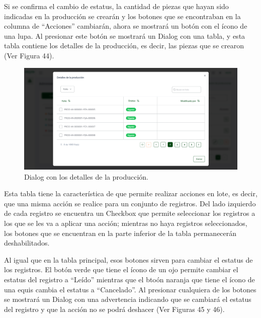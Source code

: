 Si se confirma el cambio de estatus, la cantidad de piezas que hayan sido indicadas en la producción se crearán y los botones que se encontraban en la columna de ``Acciones'' cambiarán, ahora se mostrará un botón con el ícono de una lupa. Al presionar este botón se mostrará un Dialog con una tabla, y esta tabla contiene los detalles de la producción, es decir, las piezas que se crearon (Ver Figura 44).

    \begin{figure}[H]
        \begin{center}
            \includegraphics[scale=0.33]{img/actividades/producciones/prod-detalles.png}
            \caption{Dialog con los detalles de la producción.}
            \label{fig:prod-detalles}
        \end{center}
    \end{figure}

Esta tabla tiene la característica de que permite realizar acciones en lote, es decir, que una misma acción se realice para un conjunto de registros. Del lado izquierdo de cada registro se encuentra un Checkbox que permite seleccionar los registros a los que se les va a aplicar una acción; mientras no haya registros seleccionados, los botones que se encuentran en la parte inferior de la tabla permanecerán deshabilitados.

Al igual que en la tabla principal, esos botones sirven para cambiar el estatus de los registros. El botón verde que tiene el ícono de un ojo permite cambiar el estatus del registro a ``Leído'' mientras que el btoón naranja que tiene el ícono de una equis cambia el estatus a ``Cancelado''. Al presionar cualquiera de los botones se mostrará un Dialog con una advertencia indicando que se cambiará el estatus del registro y que la acción no se podrá deshacer (Ver Figuras 45 y 46).

